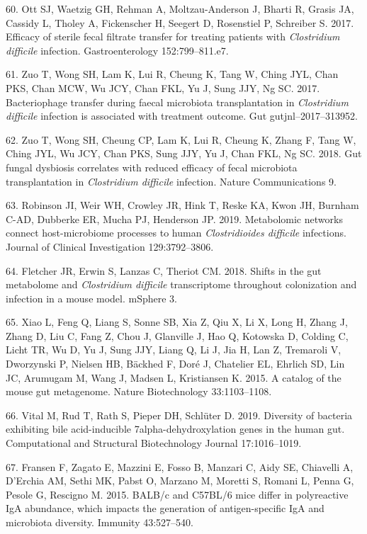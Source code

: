 \documentclass[11pt,]{article}
\begin{document}
\hypertarget{ref-Ott2017}{}
60. Ott SJ, Waetzig GH, Rehman A, Moltzau-Anderson J, Bharti R, Grasis
JA, Cassidy L, Tholey A, Fickenscher H, Seegert D, Rosenstiel P,
Schreiber S. 2017. Efficacy of sterile fecal filtrate transfer for
treating patients with \emph{Clostridium difficile} infection.
Gastroenterology 152:799--811.e7.

\hypertarget{ref-Zuo2017}{}
61. Zuo T, Wong SH, Lam K, Lui R, Cheung K, Tang W, Ching JYL, Chan PKS,
Chan MCW, Wu JCY, Chan FKL, Yu J, Sung JJY, Ng SC. 2017. Bacteriophage
transfer during faecal microbiota transplantation in \emph{Clostridium
difficile} infection is associated with treatment outcome. Gut
gutjnl--2017--313952.

\hypertarget{ref-Zuo2018}{}
62. Zuo T, Wong SH, Cheung CP, Lam K, Lui R, Cheung K, Zhang F, Tang W,
Ching JYL, Wu JCY, Chan PKS, Sung JJY, Yu J, Chan FKL, Ng SC. 2018. Gut
fungal dysbiosis correlates with reduced efficacy of fecal microbiota
transplantation in \emph{Clostridium difficile} infection. Nature
Communications 9.

\hypertarget{ref-Robinson2019}{}
63. Robinson JI, Weir WH, Crowley JR, Hink T, Reske KA, Kwon JH, Burnham
C-AD, Dubberke ER, Mucha PJ, Henderson JP. 2019. Metabolomic networks
connect host-microbiome processes to human \emph{Clostridioides
difficile} infections. Journal of Clinical Investigation 129:3792--3806.

\hypertarget{ref-Fletcher2018}{}
64. Fletcher JR, Erwin S, Lanzas C, Theriot CM. 2018. Shifts in the gut
metabolome and \emph{Clostridium difficile} transcriptome throughout
colonization and infection in a mouse model. mSphere 3.

\hypertarget{ref-Xiao2015}{}
65. Xiao L, Feng Q, Liang S, Sonne SB, Xia Z, Qiu X, Li X, Long H, Zhang
J, Zhang D, Liu C, Fang Z, Chou J, Glanville J, Hao Q, Kotowska D,
Colding C, Licht TR, Wu D, Yu J, Sung JJY, Liang Q, Li J, Jia H, Lan Z,
Tremaroli V, Dworzynski P, Nielsen HB, Bäckhed F, Doré J, Chatelier EL,
Ehrlich SD, Lin JC, Arumugam M, Wang J, Madsen L, Kristiansen K. 2015. A
catalog of the mouse gut metagenome. Nature Biotechnology 33:1103--1108.

\hypertarget{ref-Vital2019}{}
66. Vital M, Rud T, Rath S, Pieper DH, Schlüter D. 2019. Diversity of
bacteria exhibiting bile acid-inducible 7alpha-dehydroxylation genes in
the human gut. Computational and Structural Biotechnology Journal
17:1016--1019.

\hypertarget{ref-Fransen2015}{}
67. Fransen F, Zagato E, Mazzini E, Fosso B, Manzari C, Aidy SE,
Chiavelli A, D'Erchia AM, Sethi MK, Pabst O, Marzano M, Moretti S,
Romani L, Penna G, Pesole G, Rescigno M. 2015. BALB/c and C57BL/6 mice
differ in polyreactive IgA abundance, which impacts the generation of
antigen-specific IgA and microbiota diversity. Immunity 43:527--540.
\end{document}
